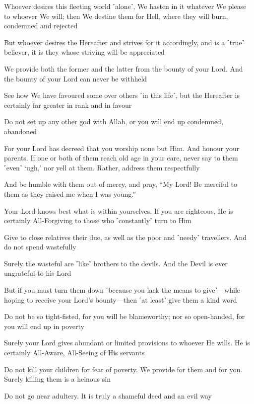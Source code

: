 Whoever desires this fleeting world ˹alone˺, We hasten in it whatever We please to whoever We will; then We destine them for Hell, where they will burn, condemned and rejected

But whoever desires the Hereafter and strives for it accordingly, and is a ˹true˺ believer, it is they whose striving will be appreciated

We provide both the former and the latter from the bounty of your Lord. And the bounty of your Lord can never be withheld

See how We have favoured some over others ˹in this life˺, but the Hereafter is certainly far greater in rank and in favour

Do not set up any other god with Allah, or you will end up condemned, abandoned

For your Lord has decreed that you worship none but Him. And honour your parents. If one or both of them reach old age in your care, never say to them ˹even˺ ‘ugh,’ nor yell at them. Rather, address them respectfully

And be humble with them out of mercy, and pray, “My Lord! Be merciful to them as they raised me when I was young.”

Your Lord knows best what is within yourselves. If you are righteous, He is certainly All-Forgiving to those who ˹constantly˺ turn to Him

Give to close relatives their due, as well as the poor and ˹needy˺ travellers. And do not spend wastefully

Surely the wasteful are ˹like˺ brothers to the devils. And the Devil is ever ungrateful to his Lord

But if you must turn them down ˹because you lack the means to give˺—while hoping to receive your Lord’s bounty—then ˹at least˺ give them a kind word

Do not be so tight-fisted, for you will be blameworthy; nor so open-handed, for you will end up in poverty

Surely your Lord gives abundant or limited provisions to whoever He wills. He is certainly All-Aware, All-Seeing of His servants

Do not kill your children for fear of poverty. We provide for them and for you. Surely killing them is a heinous sin

Do not go near adultery. It is truly a shameful deed and an evil way

